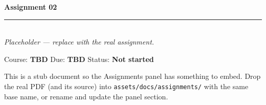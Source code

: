 \documentclass[11pt]{article}
\begin{document}
\begin{center}
  {\Large\bfseries Assignment 02 \\[2pt]}
  {\color{forgeamber}\rule{0.4\linewidth}{1pt}}\\[8pt]
  {\itshape Placeholder — replace with the real assignment.}
\end{center}
\vspace{1em}
\noindent Course: \textbf{TBD} \hfill Due: \textbf{TBD} \hfill Status: \textbf{Not started}
\vspace{1em}

\noindent This is a stub document so the Assignments panel has something to embed.
Drop the real PDF (and its source) into \texttt{assets/docs/assignments/} with the
same base name, or rename and update the panel section.
\end{document}
